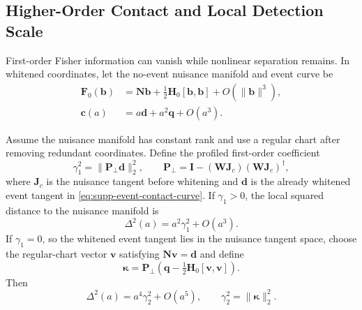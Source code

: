 \subsection{Higher-Order Contact and Local Detection Scale}

First-order Fisher information can vanish while nonlinear separation remains. In whitened coordinates, let the no-event nuisance manifold and event curve be
\begin{align}
 \bm F_0(\bm b)&=\bm N\bm b+\tfrac12\bm H_0[\bm b,\bm b]
 +O(\|\bm b\|^3),\label{eq:supp-nuisance-manifold}\\
 \bm c(a)&=a\bm d+a^2\bm q+O(a^3).
 \label{eq:supp-event-contact-curve}
\end{align}

\begin{theorem}
Assume the nuisance manifold has constant rank and use a regular chart after
removing redundant coordinates. Define the profiled first-order coefficient
\begin{equation}
 \gamma_1^2=\|\bm P_{\perp}\bm d\|_2^2,
 \qquad
 \bm P_{\perp}=\bm I-(\bm W\bm J_c)(\bm W\bm J_c)^{\dagger},
 \label{eq:supp-gamma-one}
\end{equation}
where $\bm J_c$ is the nuisance tangent before whitening and $\bm d$ is the
already whitened event tangent in \eqref{eq:supp-event-contact-curve}. If
$\gamma_1>0$, the local squared distance to the
nuisance manifold is
\begin{equation}
 \Delta^2(a)=a^2\gamma_1^2+O(a^3).
 \label{eq:supp-first-order-contact}
\end{equation}
If $\gamma_1=0$, so the whitened event tangent lies in the nuisance tangent
space, choose the regular-chart vector $\bm v$ satisfying $\bm N\bm v=\bm d$
and define
\begin{equation}
 \bm\kappa=\bm P_{\perp}
 \left(\bm q-\tfrac12\bm H_0[\bm v,\bm v]\right).
 \label{eq:supp-relative-curvature}
\end{equation}
Then
\begin{equation}
 \Delta^2(a)=a^4\gamma_2^2+O(a^5),
 \qquad \gamma_2^2=\|\bm\kappa\|_2^2.
 \label{eq:supp-second-order-contact}
\end{equation}
\label{thm:supp-relative-contact}
\end{theorem}

